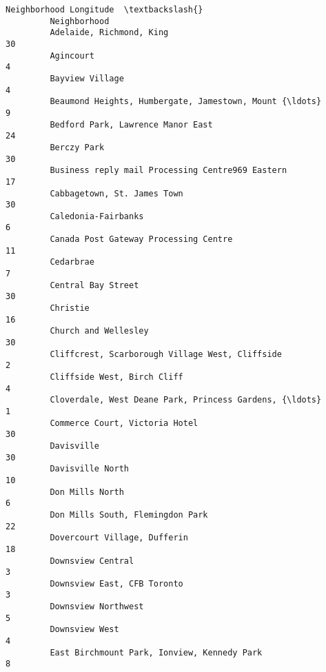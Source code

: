 \documentclass[11pt]{article}
\begin{document}
\begin{Verbatim}[commandchars=\\\{\}]
                                                             Neighborhood Longitude  \textbackslash{}
         Neighborhood                                                                 
         Adelaide, Richmond, King                                                30   
         Agincourt                                                                4   
         Bayview Village                                                          4   
         Beaumond Heights, Humbergate, Jamestown, Mount {\ldots}                       9   
         Bedford Park, Lawrence Manor East                                       24   
         Berczy Park                                                             30   
         Business reply mail Processing Centre969 Eastern                        17   
         Cabbagetown, St. James Town                                             30   
         Caledonia-Fairbanks                                                      6   
         Canada Post Gateway Processing Centre                                   11   
         Cedarbrae                                                                7   
         Central Bay Street                                                      30   
         Christie                                                                16   
         Church and Wellesley                                                    30   
         Cliffcrest, Scarborough Village West, Cliffside                          2   
         Cliffside West, Birch Cliff                                              4   
         Cloverdale, West Deane Park, Princess Gardens, {\ldots}                       1   
         Commerce Court, Victoria Hotel                                          30   
         Davisville                                                              30   
         Davisville North                                                        10   
         Don Mills North                                                          6   
         Don Mills South, Flemingdon Park                                        22   
         Dovercourt Village, Dufferin                                            18   
         Downsview Central                                                        3   
         Downsview East, CFB Toronto                                              3   
         Downsview Northwest                                                      5   
         Downsview West                                                           4   
         East Birchmount Park, Ionview, Kennedy Park                              8   

\end{Verbatim}
\end{document}
